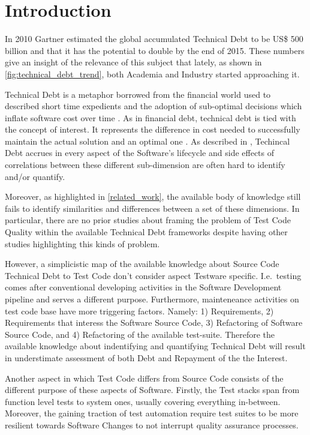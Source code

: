 \chapter{Introduction}

In 2010 Gartner estimated the global accumulated Technical Debt to be US\$ 500 billion \cite{costOfTechnicalDebt} and that it has the potential to double by the end of 2015. These numbers give an insight of the relevance of this subject that lately, as shown in \ref{fig:technical_debt_trend}, both Academia and Industry started approaching it.

Technical Debt is a metaphor borrowed from the financial world used to described short time expedients and the adoption of sub-optimal decisions which inflate software cost over time \cite{first_mention_of_TD}. As in financial debt, technical debt is tied with the concept of interest. It represents the difference in cost needed to successfully maintain the actual solution and an optimal one \cite{technicalDebtInterest}. As described in \cite{mapping_study_td, exploration_of_td, exploration_of_td2}, Techincal Debt accrues in every aspect of the Software's lifecycle and side effects of correlations between these different sub-dimension are often hard to identify and/or quantify.

Moreover, as highlighted in \ref{related_work}, the available body of knowledge still fails to identify similarities and differences between a set of these dimensions. In particular, there are no prior studies about framing the problem of Test Code Quality within the available Technical Debt frameworks despite having other studies highlighting this kinds of problem.

However, a simplicistic map of the available knowledge about Source Code Technical Debt to Test Code don't consider aspect Testware specific. I.e.\ testing comes after conventional developing activities in the Software Development pipeline and serves a different purpose. Furthermore, mainteneance activities on test code base have more triggering factors. Namely: 1) Requirements, 2) Requirements that interess the Software Source Code, 3) Refactoring of Software Source Code, and 4) Refactoring of the available test-suite. Therefore the available knowledge about indentifying and quantifying Technical Debt will result in understimate assessment of both Debt and Repayment of the the Interest.

Another aspect in which Test Code differs from Source Code consists of the different purpose of these aspects of Software. Firstly, the Test stacks span from function level tests to system ones, usually covering everything in-between. Moreover, the gaining traction of test automation require test suites to be more resilient towards Software Changes to not interrupt quality assurance processes.

